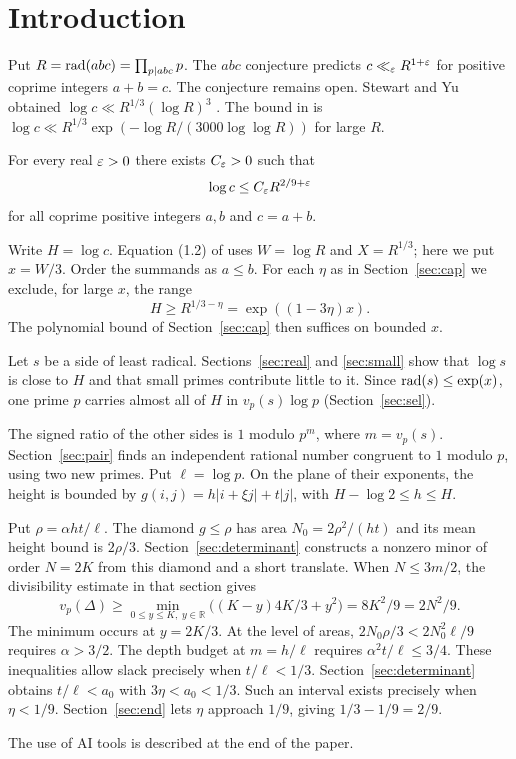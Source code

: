 \section{Introduction}
Put $R=\operatorname{rad}(abc)=\prod_{p\mid abc}p$. The $abc$ conjecture predicts
$c\ll_\varepsilon R^{1+\varepsilon}$ for positive coprime integers $a+b=c$.
The conjecture remains open. Stewart and Yu obtained
$\log c\ll R^{1/3}(\log R)^3$ \cite[Theorem~1]{SY2001}.
The bound in \cite[Theorem~1, (1.1)]{Zhang2026Third} is
$\log c\ll R^{1/3}\exp(-\log R/(3000\log\log R))$ for large $R$.

\begin{theorem}\label{thm:main}
For every real $\varepsilon>0$ there exists $C_\varepsilon>0$ such that
\[
                 \log c\le C_\varepsilon R^{2/9+\varepsilon}
\]
for all coprime positive integers $a,b$ and $c=a+b$.
\end{theorem}

Write $H=\log c$. Equation (1.2) of \cite{Zhang2026Third} uses
$W=\log R$ and $X=R^{1/3}$; here we put $x=W/3$.
Order the summands as $a\le b$.
For each $\eta$ as in Section~\ref{sec:cap} we exclude, for large $x$, the range
\begin{equation}\label{eq:high}
                     H\ge R^{1/3-\eta}=\exp((1-3\eta)x).
\end{equation}
The polynomial bound of Section~\ref{sec:cap} then suffices on bounded $x$.

Let $s$ be a side of least radical. Sections~\ref{sec:real} and
\ref{sec:small} show that $\log s$ is close to $H$ and that small
primes contribute little to it. Since $\operatorname{rad}(s)\le\exp(x)$,
one prime $p$ carries almost all of $H$ in $v_p(s)\log p$
(Section~\ref{sec:sel}).

The signed ratio of the other sides is $1$ modulo $p^m$, where $m=v_p(s)$.
Section~\ref{sec:pair} finds an independent rational number congruent to
$1$ modulo $p$, using two new primes. Put $\ell=\log p$.
On the plane of their exponents, the height is bounded by
$g(i,j)=h|i+\xi j|+t|j|$, with $H-\log2\le h\le H$.

Put $\rho=\alpha ht/\ell$. The diamond $g\le\rho$ has area
$N_0=2\rho^2/(ht)$ and its mean
height bound is $2\rho/3$. Section~\ref{sec:determinant} constructs a nonzero
minor of order $N=2K$ from this diamond and a short translate.
When $N\le3m/2$, the divisibility estimate in that section gives
\[
  v_p(\Delta)\ge
  \min_{0\le y\le K,\; y\in\mathbb R}
    \big((K-y)4K/3+y^2\big)=8K^2/9=2N^2/9.
\]
The minimum occurs at $y=2K/3$. At the level of areas,
$2N_0\rho/3<2N_0^2\ell/9$ requires $\alpha>3/2$.
The depth budget at $m=h/\ell$ requires $\alpha^2t/\ell\le3/4$.
These inequalities allow slack precisely when $t/\ell<1/3$.
Section~\ref{sec:determinant} obtains $t/\ell<a_0$ with
$3\eta<a_0<1/3$. Such an interval exists precisely when $\eta<1/9$.
Section~\ref{sec:end}
lets $\eta$ approach $1/9$, giving $1/3-1/9=2/9$.

The use of AI tools is described at the end of the paper.
